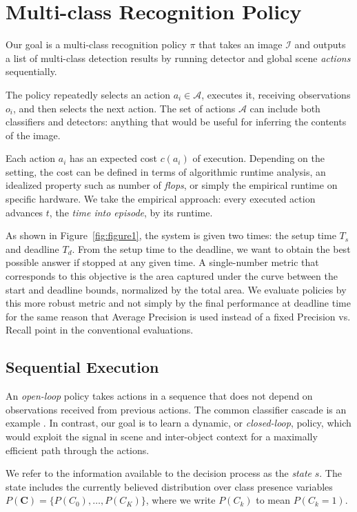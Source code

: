 
\section{Multi-class Recognition Policy} \label{sec:tech}

Our goal is a multi-class recognition policy $\pi$ that takes an image $\mathcal{I}$ and outputs a list of multi-class detection results by running detector and global scene \emph{actions} sequentially.

The policy repeatedly selects an action $a_i \in \mathcal{A}$, executes it, receiving observations $o_i$, and then selects the next action.
The set of actions $\mathcal{A}$ can include both classifiers and detectors: anything that would be useful for inferring the contents of the image.

Each action $a_i$ has an expected cost $c(a_i)$ of execution.
Depending on the setting, the cost can be defined in terms of algorithmic runtime analysis, an idealized property such as number of \emph{flops}, or simply the empirical runtime on specific hardware.
We take the empirical approach: every executed action advances $t$, the \emph{time into episode}, by its runtime.

As shown in Figure~\ref{fig:figure1}, the system is given two times: the setup time $T_s$ and deadline $T_d$.
From the setup time to the deadline, we want to obtain the best possible answer if stopped at any given time.
A single-number metric that corresponds to this objective is the area captured under the curve between the start and deadline bounds, normalized by the total area.
We evaluate policies by this more robust metric and not simply by the final performance at deadline time for the same reason that Average Precision is used instead of a fixed Precision vs. Recall point in the conventional evaluations.

\subsection{Sequential Execution}
An \emph{open-loop} policy takes actions in a sequence that does not depend on observations received from previous actions.
The common classifier cascade is an example \cite{Viola2001}.
In contrast, our goal is to learn a dynamic, or \emph{closed-loop}, policy, which would exploit the signal in scene and inter-object context for a maximally efficient path through the actions.

We refer to the information available to the decision process as the \emph{state} $s$.
The state includes the currently believed distribution over class presence variables $P(\mathbf{C}) = \{P(C_0), \ldots, P(C_K)\}$, where we write $P(C_k)$ to mean $P(C_k=1)$.

